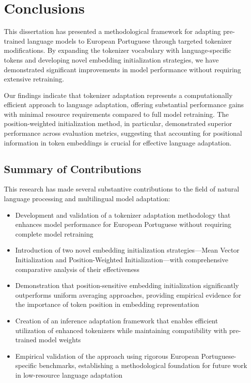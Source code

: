 
\chapter{Conclusions}


\label{chap:conclusions}

This dissertation has presented a methodological framework for adapting pre-trained language models to European Portuguese through targeted tokenizer modifications. By expanding the tokenizer vocabulary with language-specific tokens and developing novel embedding initialization strategies, we have demonstrated significant improvements in model performance without requiring extensive retraining.

Our findings indicate that tokenizer adaptation represents a computationally efficient approach to language adaptation, offering substantial performance gains with minimal resource requirements compared to full model retraining. The position-weighted initialization method, in particular, demonstrated superior performance across evaluation metrics, suggesting that accounting for positional information in token embeddings is crucial for effective language adaptation.


\section{Summary of Contributions}
This research has made several substantive contributions to the field of natural language processing and multilingual model adaptation:

\begin{itemize}
    \item Development and validation of a tokenizer adaptation methodology that enhances model performance for European Portuguese without requiring complete model retraining
    
    \item Introduction of two novel embedding initialization strategies—Mean Vector Initialization and Position-Weighted Initialization—with comprehensive comparative analysis of their effectiveness
    
    \item Demonstration that position-sensitive embedding initialization significantly outperforms uniform averaging approaches, providing empirical evidence for the importance of token position in embedding representation
    
    \item Creation of an inference adaptation framework that enables efficient utilization of enhanced tokenizers while maintaining compatibility with pre-trained model weights
    
    \item Empirical validation of the approach using rigorous European Portuguese-specific benchmarks, establishing a methodological foundation for future work in low-resource language adaptation
\end{itemize}

